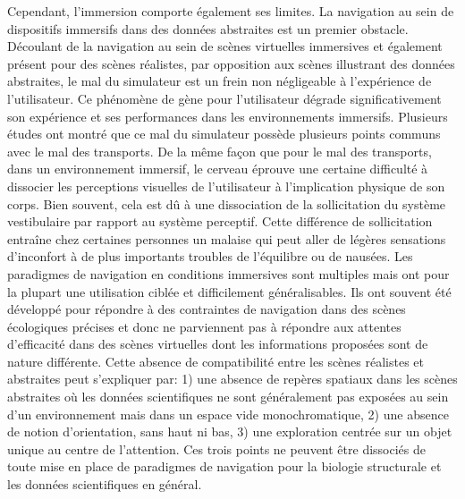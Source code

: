 Cependant, l'immersion comporte également ses limites. La navigation au sein de dispositifs immersifs dans des données abstraites est un premier obstacle. Découlant de la navigation au sein de scènes virtuelles immersives et également présent pour des scènes réalistes, par opposition aux scènes illustrant des données abstraites, le mal du simulateur est un frein non négligeable à l'expérience de l'utilisateur. Ce phénomène de gène pour l'utilisateur dégrade significativement son expérience et ses performances dans les environnements immersifs. Plusieurs études ont montré que ce mal du simulateur possède plusieurs points communs avec le mal des transports. De la même façon que pour le mal des transports, dans un environnement immersif, le cerveau éprouve une certaine difficulté à dissocier les perceptions visuelles de l'utilisateur à l'implication physique de son corps. Bien souvent, cela est dû à une dissociation de la sollicitation du système vestibulaire par rapport au système perceptif. Cette différence de sollicitation entraîne chez certaines personnes un malaise qui peut aller de légères sensations d'inconfort à de plus importants troubles de l'équilibre ou de nausées. Les paradigmes de navigation en conditions immersives sont multiples mais ont pour la plupart une utilisation ciblée et difficilement généralisables. Ils ont souvent été développé pour répondre à des contraintes de navigation dans des scènes écologiques précises et donc ne parviennent pas à répondre aux attentes d'efficacité dans des scènes virtuelles dont les informations proposées sont de nature différente. Cette absence de compatibilité entre les scènes réalistes et abstraites peut s'expliquer par: 1) une absence de repères spatiaux dans les scènes abstraites où les données scientifiques ne sont généralement pas exposées au sein d'un environnement mais dans un espace vide monochromatique, 2) une absence de notion d'orientation, sans haut ni bas, 3) une exploration centrée sur un objet unique au centre de l'attention. Ces trois points ne peuvent être dissociés de toute mise en place de paradigmes de navigation pour la biologie structurale et les données scientifiques en général.
